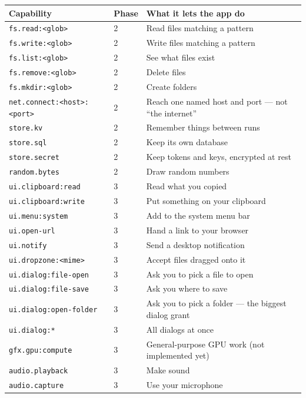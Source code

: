 \documentclass[11pt,a4paper]{report}
\begin{document}
\begin{center}
\begin{longtable}{llp{6.4cm}}
\toprule
\textbf{Capability} & \textbf{Phase} & \textbf{What it lets the app do} \\
\midrule
\endhead
\texttt{fs.read:<glob>} & 2 & Read files matching a pattern \\
\texttt{fs.write:<glob>} & 2 & Write files matching a pattern \\
\texttt{fs.list:<glob>} & 2 & See what files exist \\
\texttt{fs.remove:<glob>} & 2 & Delete files \\
\texttt{fs.mkdir:<glob>} & 2 & Create folders \\
\texttt{net.connect:<host>:<port>} & 2 & Reach one named host and port --- not ``the internet'' \\
\texttt{store.kv} & 2 & Remember things between runs \\
\texttt{store.sql} & 2 & Keep its own database \\
\texttt{store.secret} & 2 & Keep tokens and keys, encrypted at rest \\
\texttt{random.bytes} & 2 & Draw random numbers \\
\texttt{ui.clipboard:read} & 3 & Read what you copied \\
\texttt{ui.clipboard:write} & 3 & Put something on your clipboard \\
\texttt{ui.menu:system} & 3 & Add to the system menu bar \\
\texttt{ui.open-url} & 3 & Hand a link to your browser \\
\texttt{ui.notify} & 3 & Send a desktop notification \\
\texttt{ui.dropzone:<mime>} & 3 & Accept files dragged onto it \\
\texttt{ui.dialog:file-open} & 3 & Ask you to pick a file to open \\
\texttt{ui.dialog:file-save} & 3 & Ask you where to save \\
\texttt{ui.dialog:open-folder} & 3 & Ask you to pick a folder --- the biggest dialog grant \\
\texttt{ui.dialog:*} & 3 & All dialogs at once \\
\texttt{gfx.gpu:compute} & 3 & General-purpose GPU work (not implemented yet) \\
\texttt{audio.playback} & 3 & Make sound \\
\texttt{audio.capture} & 3 & Use your microphone \\
\bottomrule
\end{longtable}
\end{center}
\end{document}
